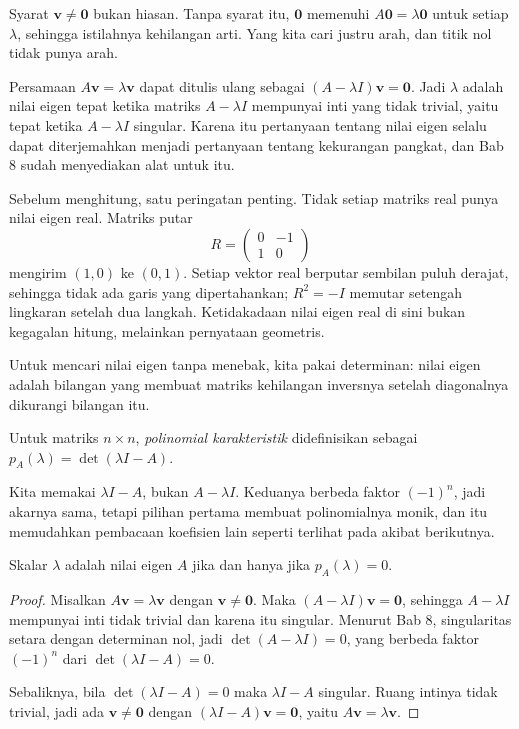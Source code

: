 Syarat $\mathbf{v}\neq\mathbf{0}$ bukan hiasan. Tanpa syarat itu, $\mathbf{0}$ memenuhi
$A\mathbf{0}=\lambda\mathbf{0}$ untuk setiap $\lambda$, sehingga istilahnya kehilangan arti. Yang
kita cari justru arah, dan titik nol tidak punya arah.

Persamaan $A\mathbf{v}=\lambda\mathbf{v}$ dapat ditulis ulang sebagai
$(A-\lambda I)\mathbf{v}=\mathbf{0}$. Jadi $\lambda$ adalah nilai eigen tepat ketika matriks
$A-\lambda I$ mempunyai inti yang tidak trivial, yaitu tepat ketika $A-\lambda I$ singular.
Karena itu pertanyaan tentang nilai eigen selalu dapat diterjemahkan menjadi pertanyaan tentang
kekurangan pangkat, dan Bab 8 sudah menyediakan alat untuk itu.

Sebelum menghitung, satu peringatan penting. Tidak setiap matriks real punya nilai eigen real.
Matriks putar
\[
  R=\begin{pmatrix}0&-1\\ 1&0\end{pmatrix}
\]
mengirim $(1,0)$ ke $(0,1)$. Setiap vektor real berputar sembilan puluh derajat, sehingga tidak ada
garis yang dipertahankan; $R^{2}=-I$ memutar setengah lingkaran setelah dua langkah.
Ketidakadaan nilai eigen real di sini bukan kegagalan hitung, melainkan pernyataan geometris.

Untuk mencari nilai eigen tanpa menebak, kita pakai determinan: nilai eigen adalah bilangan yang
membuat matriks kehilangan inversnya setelah diagonalnya dikurangi bilangan itu.


\begin{definisi}
Untuk matriks $n\times n$, \emph{polinomial karakteristik} didefinisikan sebagai
$p_{A}(\lambda)=\det(\lambda I-A)$.
\end{definisi}

Kita memakai $\lambda I-A$, bukan $A-\lambda I$. Keduanya berbeda faktor $(-1)^{n}$, jadi akarnya
sama, tetapi pilihan pertama membuat polinomialnya monik, dan itu memudahkan pembacaan koefisien
lain seperti terlihat pada akibat berikutnya.

\begin{teorema}
Skalar $\lambda$ adalah nilai eigen $A$ jika dan hanya jika $p_{A}(\lambda)=0$.
\end{teorema}

\begin{proof}
Misalkan $A\mathbf{v}=\lambda\mathbf{v}$ dengan $\mathbf{v}\neq\mathbf{0}$. Maka
$(A-\lambda I)\mathbf{v}=\mathbf{0}$, sehingga $A-\lambda I$ mempunyai inti tidak trivial dan
karena itu singular. Menurut Bab 8, singularitas setara dengan determinan nol, jadi
$\det(A-\lambda I)=0$, yang berbeda faktor $(-1)^{n}$ dari $\det(\lambda I-A)=0$.

Sebaliknya, bila $\det(\lambda I-A)=0$ maka $\lambda I-A$ singular. Ruang intinya tidak trivial,
jadi ada $\mathbf{v}\neq\mathbf{0}$ dengan $(\lambda I-A)\mathbf{v}=\mathbf{0}$, yaitu
$A\mathbf{v}=\lambda\mathbf{v}$.
\end{proof}

